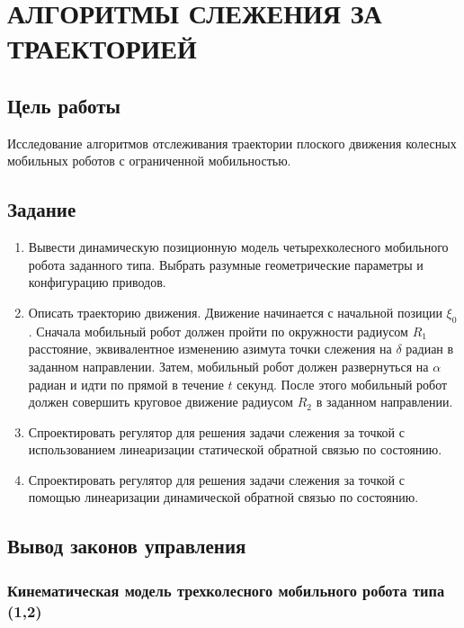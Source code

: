 \chapter{АЛГОРИТМЫ СЛЕЖЕНИЯ ЗА ТРАЕКТОРИЕЙ}

\section{Цель работы}

Исследование алгоритмов отслеживания траектории плоского движения колесных мобильных роботов с ограниченной мобильностью.

\section{Задание}

\begin{enumerate}
\item Вывести динамическую позиционную модель четырехколесного мобильного робота заданного типа. Выбрать разумные геометрические параметры и конфигурацию приводов.

\item Описать траекторию движения. Движение начинается с начальной позиции $\xi_0$. Сначала мобильный робот должен пройти по окружности радиусом $R_1$ расстояние, эквивалентное изменению азимута точки слежения на $\delta$ радиан в заданном направлении. Затем, мобильный робот должен развернуться на $\alpha$ радиан и идти по прямой в течение $t$ секунд. После этого мобильный робот должен совершить круговое движение радиусом $R_2$ в заданном направлении.

\item Спроектировать регулятор для решения задачи слежения за точкой с использованием линеаризации статической обратной связью по состоянию.

\item Спроектировать регулятор для решения задачи слежения за точкой с помощью линеаризации динамической обратной связью по состоянию.
\end{enumerate}

\section{Вывод законов управления}

\subsection{Кинематическая модель трехколесного мобильного робота типа (1,2)}

